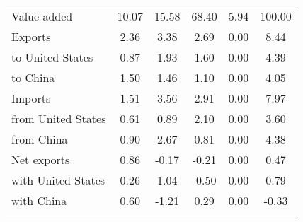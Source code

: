 \begin{tabular}{lccccc}
Value added& 10.07& 15.58& 68.40& 5.94& 100.00\\
Exports& 2.36& 3.38& 2.69& 0.00& 8.44\\
\quad to United States& 0.87& 1.93& 1.60& 0.00& 4.39\\
\quad to China& 1.50& 1.46& 1.10& 0.00& 4.05\\
Imports& 1.51& 3.56& 2.91& 0.00& 7.97\\
\quad from United States& 0.61& 0.89& 2.10& 0.00& 3.60\\
\quad from China& 0.90& 2.67& 0.81& 0.00& 4.38\\
Net exports& 0.86& -0.17& -0.21& 0.00& 0.47\\
\quad with United States& 0.26& 1.04& -0.50& 0.00& 0.79\\
\quad with China& 0.60& -1.21& 0.29& 0.00& -0.33\\
\\
\bottomrule
\end{tabular}
